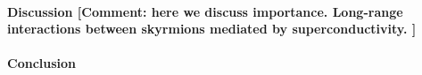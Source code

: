 \documentclass[twocolumn,showpacs,floatfix,nofootinbib,longbibliography]{revtex4-1}
\begin{document}
\paragraph*{Discussion [Comment: here we discuss importance. Long-range interactions between skyrmions mediated by superconductivity. ] } \label{sec:discussion}



\paragraph*{Conclusion} \label{sec:conclusion}




\newpage
%



\appendix

\end{document}
